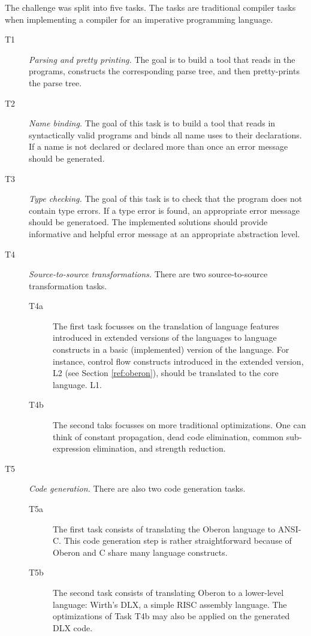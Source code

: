 \documentclass[english,preprint,12pt]{elsarticle}
\begin{document}
The challenge was split into five tasks. The tasks are traditional compiler tasks when implementing a compiler
for an imperative programming language.
\begin{description}
\item[T1] \emph{Parsing and pretty printing.} The goal is to build a tool that reads in the programs, constructs
the corresponding parse tree, and then pretty-prints the parse tree. 
\item[T2] \emph{Name binding.} The goal of this task is to build a tool that reads in syntactically valid programs
and binds all name uses to their declarations. If a name is not declared or declared more than once an error
message should be generated.
\item[T3] \emph{Type checking.} The goal of this task is to check that the program does not contain
type errors. If a type error is found, an appropriate error message should be generatoed. 
The implemented solutions should provide informative and helpful error message at an
appropriate abstraction level.

\item[T4] \emph{Source-to-source transformations.}
There are two source-to-source transformation tasks.
\begin{description}
\item[T4a] The first task focusses on the translation of language features introduced
in extended versions of the languages to language constructs in a basic (implemented)
version of the language. For instance, control flow constructs introduced in the extended
version, L2 (see Section \ref{ref:oberon}), should be translated to the core language. L1.
\item[T4b] The second taks focusses on more traditional optimizations. One can think of
constant propagation, dead code elimination, common sub-expression elimination, and
strength reduction.
\end{description}
\item[T5] \emph{Code generation.}
There are also two code generation tasks.

\begin{description}
\item[T5a] The first task consists of translating the Oberon language to ANSI-C. This code generation step is rather
straightforward because of Oberon and C share many language constructs.
\item[T5b] The second task consists of translating Oberon to a lower-level language: Wirth's DLX, a simple RISC assembly
language. The optimizations of Task T4b may also be applied on the generated DLX code.
\end{description}
\end{description}
\end{document}

